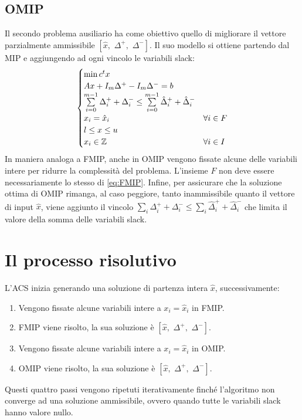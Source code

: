 \subsection{OMIP}%
\label{sub:OMIP}
Il secondo problema ausiliario ha come obiettivo quello di migliorare 
il vettore parzialmente ammissibile $[\hat x,\,\, \Delta^+,\,\, \Delta^-]$.
Il suo modello si ottiene partendo dal MIP e aggiungendo ad ogni vincolo le 
variabili slack:
\begin{equation}
    \begin{cases}
        \min c^tx\\
        Ax + I_m \Delta^+ - I_m \Delta^- = b \\
        \sum\limits_{i=0}^{m-1} \Delta^+_i + \Delta^-_i \leq \sum\limits_{i=0}^{m-1} \hat \Delta^+_i + \hat \Delta^-_i\\
        x_i = \hat x_i & \forall i \in F \\
        l \leq x \leq u\\
        x_i \in \mathbb{Z} & \forall i\in I\\
    \end{cases}
\end{equation}
In maniera analoga a FMIP, anche in OMIP vengono fissate alcune delle
variabili intere per ridurre la complessità del problema.
L'insieme $F$ non deve essere necessariamente lo stesso di \ref{eq:FMIP}.
Infine, per assicurare che la soluzione ottima di OMIP rimanga, al caso
peggiore, tanto inammissibile quanto il vettore di input $\hat x$, viene
aggiunto il vincolo 
$\sum_i \Delta^+_i + \Delta^-_i \leq \sum_i \hat \Delta^+_i + \hat \Delta^-_i$
che limita il valore della
somma delle variabili slack.

\section{Il processo risolutivo}%
\label{sec:Il processo risolutivo}
L'ACS inizia generando una soluzione di partenza intera $\hat x$, successivamente:
\begin{enumerate}
    \item Vengono fissate alcune variabili intere a $x_i = \hat x_i$ in FMIP.
    \item FMIP viene risolto, la sua soluzione è 
        $[\hat x,\,\, \Delta^+,\,\, \Delta^-]$.
    \item Vengono fissate alcune variabili intere a $x_i = \hat x_i$ in OMIP.
    \item OMIP viene risolto, la sua soluzione è 
        $[\hat x,\,\, \Delta^+,\,\, \Delta^-]$.
\end{enumerate}
Questi quattro passi vengono ripetuti iterativamente finché l'algoritmo non
converge ad una soluzione ammissibile, ovvero quando tutte le variabili slack
hanno valore nullo.

